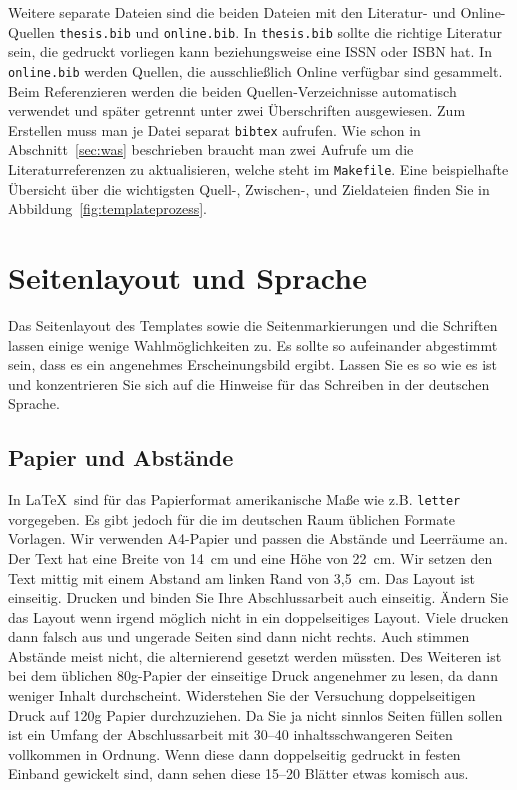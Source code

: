 \documentclass[11pt,a4paper]{report}
\begin{document}
Weitere separate Dateien sind die beiden Dateien mit 
den Literatur- und Online-Quellen 
\verb|thesis.bib| und \verb|online.bib|. \label{page:bib}
In \verb|thesis.bib| sollte die richtige Literatur sein, 
die gedruckt vorliegen kann beziehungsweise eine ISSN oder ISBN hat. 
In \verb|online.bib| werden Quellen, die ausschließlich Online verfügbar
sind gesammelt.  
Beim Referenzieren werden die beiden Quellen-Verzeichnisse automatisch
verwendet und später getrennt unter zwei Überschriften ausgewiesen. 
Zum Erstellen muss man je Datei separat \lstinline{bibtex} aufrufen. 
Wie schon in Abschnitt~\ref{sec:was} beschrieben braucht man zwei
Aufrufe um die Literaturreferenzen zu aktualisieren, welche steht
im \verb|Makefile|.
Eine beispielhafte Übersicht über die wichtigsten Quell-, 
Zwischen-, und Zieldateien finden Sie in 
Abbildung~\ref{fig:templateprozess}.


\chapter{Seitenlayout und Sprache} \label{chap:layout}

Das Seitenlayout des Templates sowie die Seitenmarkierungen
und die Schriften lassen einige wenige Wahlmöglichkeiten zu.
Es sollte so aufeinander abgestimmt sein, dass es ein 
angenehmes Erscheinungsbild ergibt.
Lassen Sie es so wie es ist und konzentrieren Sie sich auf
die Hinweise für das Schreiben in der deutschen Sprache.

\section{Papier und Abstände}

In \LaTeX\ sind für das Papierformat amerikanische Maße 
wie z.B. \verb|letter| vor\-ge\-ge\-ben. 
Es gibt jedoch für die im deutschen Raum üblichen Formate Vorlagen. 
Wir verwenden A4-Papier und passen die Abstände und Leerräume an.
Der Text hat eine Breite von 14~cm und eine Höhe von 22~cm.
Wir setzen den Text mittig mit einem Abstand am linken Rand von 
3,5~cm. 
Das Layout ist einseitig.
Drucken und binden Sie Ihre Abschlussarbeit auch einseitig.
Ändern Sie das Layout wenn irgend möglich nicht in ein doppelseitiges 
Layout.
Viele drucken dann falsch aus und ungerade Seiten sind dann nicht 
rechts.
Auch stimmen Abstände meist nicht, die alternierend gesetzt werden
müssten.
Des Weiteren ist bei dem üblichen 80g-Papier der einseitige Druck 
angenehmer zu lesen, da dann weniger Inhalt durchscheint. 
Widerstehen Sie der Versuchung doppelseitigen Druck auf 120g Papier
durchzuziehen. 
Da Sie ja nicht sinnlos Seiten füllen sollen ist ein Umfang
der Abschlussarbeit mit 30--40 inhaltsschwangeren Seiten vollkommen 
in Ordnung. 
Wenn diese dann doppelseitig gedruckt in festen Einband gewickelt sind,
dann sehen diese 15--20 Blätter etwas komisch aus. 
\end{document}
